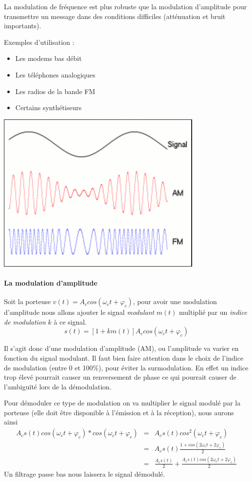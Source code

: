La modulation de fréquence est plus robuste que la modulation d'amplitude pour transmettre un message dans des conditions difficiles (atténuation et bruit importants).

Exemples d'utilisation :
\begin{itemize}
    \item Les modems bas débit
    \item Les téléphones analogiques
    \item Les radios de la bande FM
    \item Certains synthétiseurs
\end{itemize}

\begin{center}
    \includegraphics[width=0.5\linewidth]{img/modulation_am_fm.png}
\end{center}

\paragraph{La modulation d'amplitude}

Soit la porteuse $v(t) = A_c cos(\omega_c t + \varphi_c)$, pour avoir une modulation d'amplitude nous allons ajouter le signal \textit{modulant} $m(t)$ multiplié par un \textit{indice de modulation} $k$ à ce signal.  $$s(t) = [1+km(t)] A_c cos(\omega_c t + \varphi_c)$$

Il s'agit donc d'une modulation d'amplitude (AM), ou l'amplitude va varier en fonction du signal modulant. Il faut bien faire attention dans le choix de l'indice de modulation (entre 0 et 100\%), pour éviter la surmodulation. En effet un indice trop élevé pourrait causer un renversement de phase ce qui pourrait causer de l'ambiguïté lors de la démodulation.

Pour démoduler ce type de modulation on va multiplier le signal modulé par la porteuse (elle doit être disponible à l'émission et à la réception), nous aurons ainsi \begin{eqnarray*} A_c s(t)cos(\omega_c t + \varphi_c)*cos(\omega_c t + \varphi_c) &=&A_c s(t)cos^2(\omega_c t + \varphi_c)\\ &=& A_c s(t) \frac{1+ cos(2\omega_c t + 2\varphi_c)}{2}\\ &=& \frac{A_cs(t)}{2} + \frac{A_cs(t)cos(2\omega_c t + 2\varphi_c)}{2} \end{eqnarray*}
Un filtrage passe bas nous laissera le signal démodulé.

